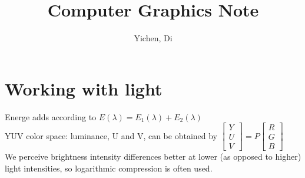 \documentclass[12pt]{article}
\title{Computer Graphics Note}
\author{Yichen, Di}
\begin{document}
\maketitle
\section{Working with light}\noindent
Energe adds according to $E(\lambda)=E_1(\lambda)+E_2(\lambda)$\\
YUV color space: luminance, U and V, can be obtained by $\begin{bmatrix}
    Y\\ U\\ V
\end{bmatrix}=P\begin{bmatrix}
    R\\ G\\ B
\end{bmatrix}$\\
We perceive brightness intensity differences better at lower (as opposed to higher) light
intensities, so logarithmic compression is often used.
\end{document}
